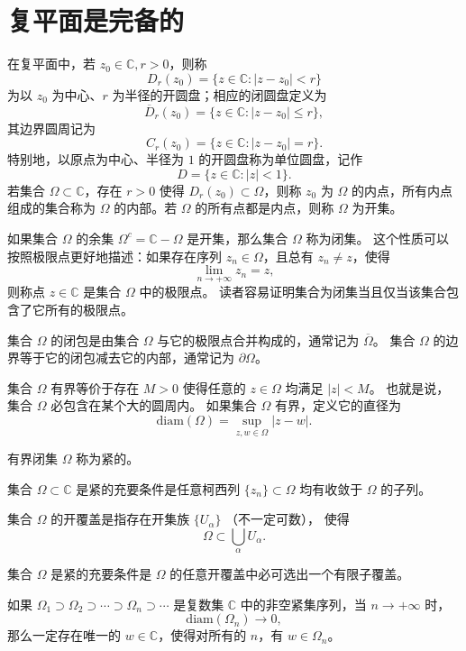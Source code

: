 \documentclass[lang=cn,10pt]{elegantbook}
\begin{document}
\section{复平面是完备的}
\begin{proposition}
    

  在复平面中，若 $z_0 \in \mathbb{C}, r>0$，则称
\[
D_r(z_0) = \{ z \in \mathbb{C} : |z-z_0| < r \}
\]
为以 $z_0$ 为中心、$r$ 为半径的开圆盘；相应的闭圆盘定义为
\[
\overline{D}_r(z_0) = \{ z \in \mathbb{C} : |z-z_0| \leq r \},
\]
其边界圆周记为
\[
C_r(z_0) = \{ z \in \mathbb{C} : |z-z_0| = r \}.
\]
特别地，以原点为中心、半径为 $1$ 的开圆盘称为单位圆盘，记作
\[
D = \{ z \in \mathbb{C} : |z| < 1 \}.
\]
若集合 $\Omega \subset \mathbb{C}$，存在 $r>0$ 使得 $D_r(z_0) \subset \Omega$，则称 $z_0$ 为 $\Omega$ 的内点，所有内点组成的集合称为 $\Omega$ 的内部。若 $\Omega$ 的所有点都是内点，则称 $\Omega$ 为开集。  
\end{proposition}
\begin{proposition}
    如果集合 $\Omega$ 的余集 $\Omega^c = \mathbb{C} - \Omega$ 是开集，那么集合 $\Omega$ 称为闭集。  
这个性质可以按照极限点更好地描述：如果存在序列 $z_n \in \Omega$，且总有 $z_n \neq z$，使得 
\[
\lim_{n\to +\infty} z_n = z,
\]
则称点 $z \in \mathbb{C}$ 是集合 $\Omega$ 中的极限点。  
读者容易证明集合为闭集当且仅当该集合包含了它所有的极限点。  

集合 $\Omega$ 的闭包是由集合 $\Omega$ 与它的极限点合并构成的，通常记为 $\overline{\Omega}$。  
集合 $\Omega$ 的边界等于它的闭包减去它的内部，通常记为 $\partial \Omega$。  

集合 $\Omega$ 有界等价于存在 $M>0$ 使得任意的 $z \in \Omega$ 均满足 $|z| < M$。  
也就是说，集合 $\Omega$ 必包含在某个大的圆周内。  
如果集合 $\Omega$ 有界，定义它的直径为
\[
\mathrm{diam}(\Omega) = \sup_{z,w \in \Omega} |z-w|.
\]

有界闭集 $\Omega$ 称为紧的。
\end{proposition}
\begin{theorem}[1.2]
集合 $\Omega \subset \mathbb{C}$ 是紧的充要条件是任意柯西列 
$\{z_n\} \subset \Omega$ 均有收敛于 $\Omega$ 的子列。
\end{theorem}

集合 $\Omega$ 的开覆盖是指存在开集族 $\{U_\alpha\}$ （不一定可数），
使得
\[
\Omega \subset \bigcup_{\alpha} U_\alpha.
\]
\begin{theorem}[1.3]
集合 $\Omega$ 是紧的充要条件是 $\Omega$ 的任意开覆盖中必可选出一个有限子覆盖。
\end{theorem}
\begin{theorem}[1.4]
如果 $\Omega_1 \supset \Omega_2 \supset \cdots \supset \Omega_n \supset \cdots$ 
是复数集 $\mathbb{C}$ 中的非空紧集序列，当 $n \to +\infty$ 时，
\[
\mathrm{diam}(\Omega_n) \to 0,
\]
那么一定存在唯一的 $w \in \mathbb{C}$，使得对所有的 $n$，有 $w \in \Omega_n$。
\end{theorem}
\end{document}
